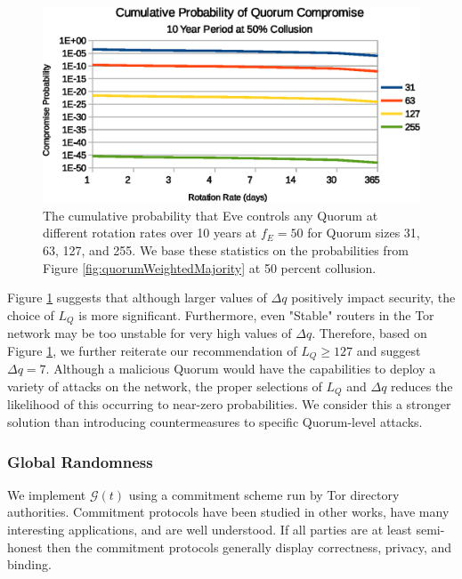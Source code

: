 \documentclass[conference]{IEEEtran}
\begin{document}
\begin{figure}[h]
	\centering
	\includegraphics[width=\linewidth]{../assets/analysis/CumulativeMaliciousQuorumNew.eps}
	\caption{The cumulative probability that Eve controls any Quorum at different rotation rates over 10 years at $ f_{E} = 50 $ for Quorum sizes 31, 63, 127, and 255. We base these statistics on the probabilities from Figure \ref{fig:quorumWeightedMajority} at 50 percent collusion.}
	\label{fig:cumulativeProbability}
\end{figure}

Figure \ref{fig:cumulativeProbability} suggests that although larger values of $ \Delta q $ positively impact security, the choice of $ L_{Q} $ is more significant. Furthermore, even "Stable" routers in the Tor network may be too unstable for very high values of $ \Delta q $. Therefore, based on Figure \ref{fig:cumulativeProbability}, we further reiterate our recommendation of $ L_{Q} \geq 127 $ and suggest $ \Delta q = 7 $. Although a malicious Quorum would have the capabilities to deploy a variety of attacks on the network, the proper selections of $ L_{Q} $ and $ \Delta q $ reduces the likelihood of this occurring to near-zero probabilities. We consider this a stronger solution than introducing countermeasures to specific Quorum-level attacks.

\subsubsection{Global Randomness}
\label{sec:RandGeneration}

We implement $ \mathcal{G}(t) $ using a commitment scheme run by Tor directory authorities\cite{GouletCommitReveal}. Commitment protocols have been studied in other works\cite{rivest1999unconditionally}\cite{naor1990bit}, have many interesting applications, and are well understood. If all parties are at least semi-honest then the commitment protocols generally display correctness, privacy, and binding. 
\end{document}

